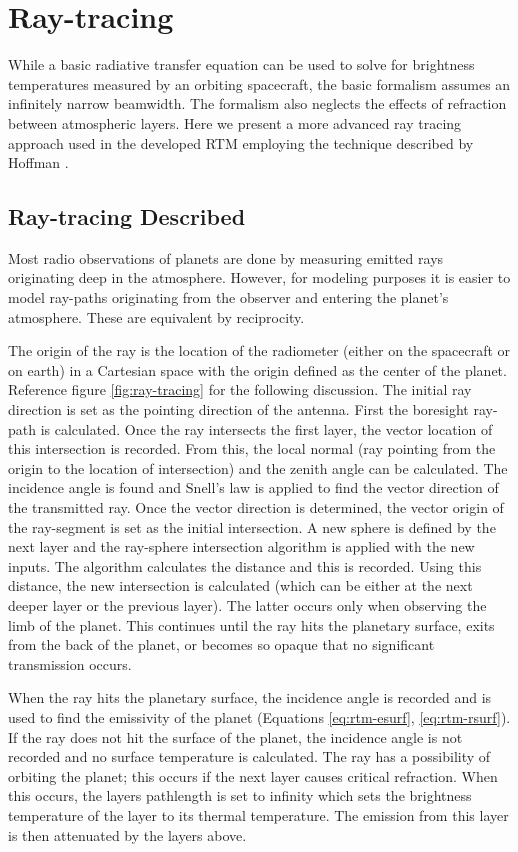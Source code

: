 \section{Ray-tracing}
While a basic radiative transfer equation can be used to solve for brightness temperatures measured by an orbiting spacecraft, the basic formalism assumes an infinitely narrow beamwidth. The formalism also neglects the effects of refraction between atmospheric layers. Here we present a more advanced ray tracing approach used in the developed RTM employing the technique described by Hoffman \cite{Hoffman-thesis}.
\subsection{Ray-tracing Described}
Most radio observations of planets are done by measuring emitted rays originating deep in the atmosphere. However, for modeling purposes it is easier to model ray-paths originating from the observer and entering the planet's atmosphere. These are equivalent by reciprocity.

The origin of the ray is the location of the radiometer (either on the spacecraft or on earth) in a Cartesian space with the origin defined as the center of the planet. Reference figure \ref{fig:ray-tracing} for the following discussion. The initial ray direction is set as the pointing direction of the antenna. First the boresight ray-path is calculated.  Once the ray intersects the first layer, the vector location of this intersection is recorded. From this, the local normal (ray pointing from the origin to the location of intersection) and the zenith angle can be calculated. The incidence angle is found and Snell's law is applied to find the vector direction of the transmitted ray. Once the vector direction is determined, the vector origin of the ray-segment is set as the initial intersection. A new sphere is defined by the next layer and the ray-sphere intersection algorithm is applied with the new inputs. The algorithm calculates the distance and this is recorded. Using this distance, the new intersection is calculated (which can be either at the next deeper layer or the previous layer). The latter occurs only when observing the limb of the planet. This continues until the ray hits the planetary surface, exits from the back of the planet, or becomes so opaque that no significant transmission occurs. 

When the ray hits the planetary surface, the incidence angle is recorded and is used to find the emissivity of the planet (Equations \ref{eq:rtm-esurf}, \ref{eq:rtm-rsurf}). If the ray does not hit the surface of the planet, the incidence angle is not recorded and no surface temperature is calculated. The ray has a possibility of orbiting the planet; this occurs if the next layer causes critical refraction. When this occurs, the layers pathlength is set to infinity which sets the brightness temperature of the layer to its thermal temperature. The emission from this layer is then attenuated by the layers above.

